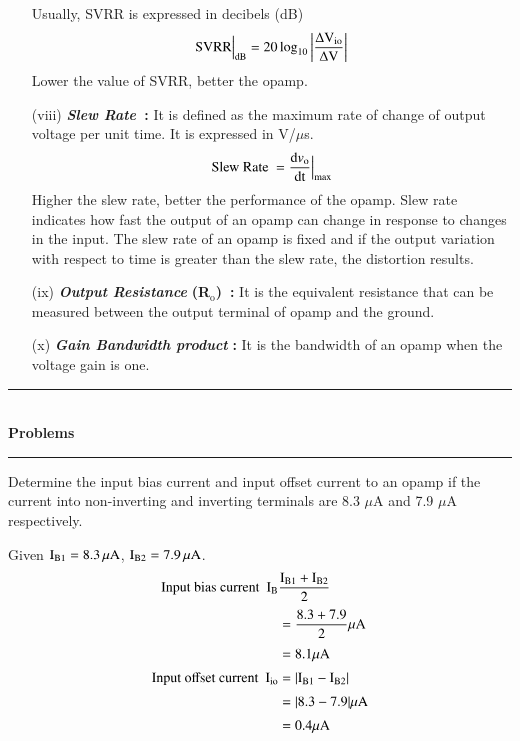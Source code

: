 \begin{itemize}
Usually, SVRR is expressed in decibels (dB)
\begin{equation}
\text{SVRR} \Big|_{\text{dB}}=20\log_{10}\left| \frac{\Delta \textrm{V}_{\text{io}}}{\Delta \textrm{V}}\right|\label{eq4.7}
\end{equation}
Lower the value of SVRR, better the opamp.

\item[(viii)] {\it\bfseries Slew Rate~}{\bf :} It is defined as the maximum rate of change of output voltage per unit time. It is expressed in V/$\mu$s.
\begin{equation}
\text{Slew Rate~} = \frac{\text{d}v_{\textrm{o}}}{\text{dt}}\Big|_{\max}\label{eq4.8}
\end{equation}
Higher the slew rate, better the performance of the opamp. Slew rate indicates how fast the output of an opamp can change in response to changes in the input. The slew rate of an opamp is fixed and if the output variation with respect to time is greater than the slew rate, the distortion results.

\item[(ix)] {\it\bfseries Output Resistance} {\bf (R$_{\text{o}}$)~:} It is the equivalent resistance that can be measured between the output terminal of opamp and the ground.

\item[(x)] {\it\bfseries Gain Bandwidth product} {\bf :} It is the bandwidth of an opamp when the voltage gain is one.
\end{itemize}

\begin{center}
\rule{4cm}{1pt}\\
{\bf\Large Problems}\\[-3pt]
\rule{4cm}{1pt}
\end{center}

\begin{problem}\label{prob4.5}
Determine the input bias current and input offset current to an opamp if the current into non-inverting and inverting terminals are 8.3 $\mu$A and 7.9 $\mu$A respectively.
\end{problem}

\begin{solution}
Given $\textrm{I}_{\text{B1}}=8.3\,\mu\textrm{A}$, $\textrm{I}_{\text{B2}}=7.9\,\mu \textrm{A}$.
\begin{align*}
\text{Input bias current~ } \textrm{I}_{\textrm{B}} & \frac{\textrm{I}_{\textrm{B} 1}+\textrm{I}_{\textrm{B} 2}}{2}\\[2pt]
&= \frac{8.3+7.9}{2}\mu\textrm{A}\\[2pt]
&= 8.1\mu\textrm{A}\\[2pt]
\text{Input offset current~ } \textrm{I}_{\text{io}} &= |\textrm{I}_{\textrm{B} 1}-\textrm{I}_{\textrm{B} 2}|\\[2pt]
&= |8.3-7.9|\mu\textrm{A}\\[2pt]
&= 0.4 \mu\textrm{A}
\end{align*}
\end{solution}

